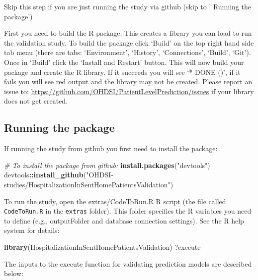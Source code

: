 \documentclass[
]{article}
\newenvironment{Shaded}{\begin{snugshade}}{\end{snugshade}}
\newcommand{\CommentTok}[1]{\textcolor[rgb]{0.56,0.35,0.01}{\textit{#1}}}
\newcommand{\KeywordTok}[1]{\textcolor[rgb]{0.13,0.29,0.53}{\textbf{#1}}}
\newcommand{\NormalTok}[1]{#1}
\newcommand{\OperatorTok}[1]{\textcolor[rgb]{0.81,0.36,0.00}{\textbf{#1}}}
\newcommand{\StringTok}[1]{\textcolor[rgb]{0.31,0.60,0.02}{#1}}
\begin{document}
Skip this step if you are just running the study via github (skip to '
Running the package')

First you need to build the R package. This creates a library you can
load to run the validation study. To build the package click `Build' on
the top right hand side tab menu (there are tabs: `Environment',
`History', `Connections', `Build', `Git'). Once in `Build' click the
`Install and Restart' button. This will now build your package and
create the R library. If it succeeds you will see `* DONE ()', if it
fails you will see red output and the library may not be created. Please
report an issue to:
\url{https://github.com/OHDSI/PatientLevelPrediction/issues} if your
library does not get created.

\hypertarget{running-the-package}{%
\subsection{Running the package}\label{running-the-package}}

If running the study from github you first need to install the package:

\begin{Shaded}
\begin{Highlighting}[]
\CommentTok{# To install the package from github:}
\KeywordTok{install.packages}\NormalTok{(}\StringTok{"devtools"}\NormalTok{)}
\NormalTok{devtools}\OperatorTok{::}\KeywordTok{install_github}\NormalTok{(}\StringTok{"OHDSI-studies/HospitalizationInSentHomePatientsValidation"}\NormalTok{)}
\end{Highlighting}
\end{Shaded}

To run the study, open the extras/CodeToRun.R R script (the file called
\texttt{CodeToRun.R} in the \texttt{extras} folder). This folder
specifies the R variables you need to define (e.g., outputFolder and
database connection settings). See the R help system for details:

\begin{Shaded}
\begin{Highlighting}[]
\KeywordTok{library}\NormalTok{(HospitalizationInSentHomePatientsValidation)}
\NormalTok{?execute}
\end{Highlighting}
\end{Shaded}

The inputs to the execute function for validating prediction models are
described below:
\end{document}
